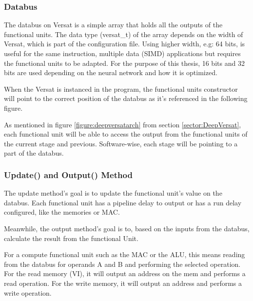 \documentclass[conference]{IEEEtran}
\begin{document}
\subsubsection{Databus}

The databus on Versat is a simple array that holds all the outputs of the functional units.
The data type (versat\_t) of the array depends on the width of Versat, which is part of the configuration file.
Using higher width, e.g: 64 bits, is useful for the same instruction, multiple data (SIMD) 
applications but requires the functional units to be adapted.
For the purpose of this thesis, 16 bits and 32 bits are used depending 
on the neural network and how it is optimized.

When the Versat is instanced in the program, the functional units constructor will point
to the correct position of the databus as it's referenced in the following figure.

As mentioned in figure \ref{figure:deepversatarch} from section \ref{sector:DeepVersat}, 
each functional unit will be able to access the output from the functional units of the
current stage and previous. Software-wise, each stage will be pointing to a part of the databus.  



\subsubsection{Update() and Output() Method}


The update method's goal is to update the functional unit's value on the databus. 
Each functional unit has a pipeline delay to output or has a run delay configured, 
like the memories or MAC.

Meanwhile, the output method's goal is to, based on the inputs from the databus, calculate the result from
 the functional Unit.

 For a compute functional unit such as the MAC or the ALU, this means reading from the databus for operands A and B
 and performing the selected operation. For the read memory (VI), it will output an address on the mem
 and performs a read operation. For the write memory, it will output an address and performs a write operation.


% 
\end{document}
